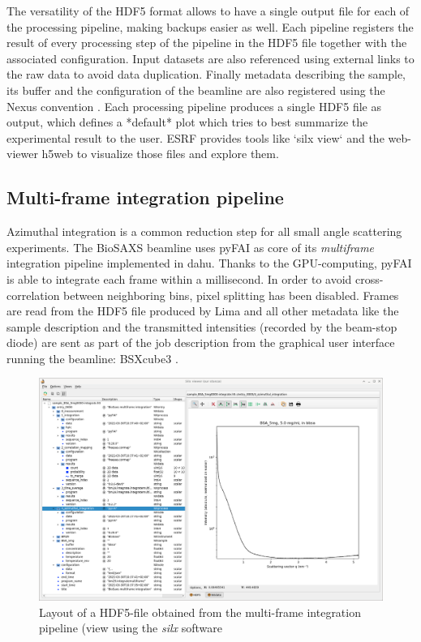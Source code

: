 \documentclass[preprint]{iucr}              %
\begin{document}
The versatility of the HDF5 format allows to have a single output file for each of the processing pipeline, making backups easier as well. 
Each pipeline registers the result of every processing step of the pipeline in the HDF5 file together with the associated configuration.
Input datasets are also referenced using external links to the raw data to avoid data duplication. 
Finally metadata describing the sample, its buffer and the configuration of the beamline are also registered using the Nexus convention \cite{nexus}.
Each processing pipeline produces a single HDF5 file as output, which defines a *default* plot which tries to best summarize the experimental result to the user.
ESRF provides tools like `silx view` \cite{silx}  and the web-viewer h5web \cite{silx} to visualize those files and explore them.


\subsection{Multi-frame integration pipeline}

Azimuthal integration is a common reduction step for all small angle scattering experiments. 
The BioSAXS beamline uses pyFAI \cite{pyfai_2020} as core of its \textit{multiframe} integration pipeline implemented in dahu.
Thanks to the GPU-computing, pyFAI is able to integrate each frame within a millisecond.
In order to avoid cross-correlation between neighboring bins, pixel splitting has been disabled.
Frames are read from the HDF5 file produced by Lima \cite{lima} and all other metadata like the sample description and the transmitted  intensities (recorded by the beam-stop diode) are sent as part of the job description from 
the graphical user interface running the beamline: BSXcube3 \cite{bm29_2022}.

\begin{figure}
\caption{Layout of a HDF5-file obtained from the multi-frame integration pipeline (view using the \textit{silx} software \cite{silx}}
\includegraphics{multiframe}
\end{figure}
\end{document}
